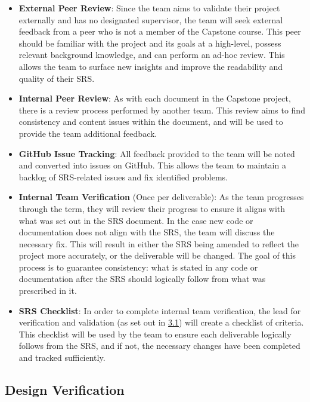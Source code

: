 \documentclass[12pt, titlepage]{article}
\begin{document}
\begin{itemize}
  \item \textbf{External Peer Review}: Since the team aims to validate their project externally and \progname{} has no designated supervisor, the team will seek
  external feedback from a peer who is not a member of the Capstone course. This peer should be familiar with the project and its goals at a high-level, 
  possess relevant background knowledge, and can perform an ad-hoc review. This allows the team to surface new insights and improve the readability and quality of their SRS.
  \item \textbf{Internal Peer Review}: As with each document in the Capstone project, there is a review process performed by another team.
  This review aims to find consistency and content issues within the document, and will be used to provide the team additional feedback.
  \item \textbf{GitHub Issue Tracking}: All feedback provided to the team will be noted and converted into issues on GitHub. This allows the team to maintain a backlog
  of SRS-related issues and fix identified problems.
  \item \textbf{Internal Team Verification} (Once per deliverable): As the team progresses through the term, they will review their
  progress to ensure it aligns with what was set out in the SRS document. In the case new code or documentation does not align
  with the SRS, the team will discuss the necessary fix. This will result in either the SRS being amended to reflect the project more accurately,
  or the deliverable will be changed. The goal of this process is to guarantee consistency: what is stated in any code or documentation after the SRS
  should logically follow from what was prescribed in it.
  \item \textbf{SRS Checklist}: In order to complete internal team verification, the lead for verification and validation (as set out in \hyperref[sec:VnVTeam]{3.1}) will
  create a checklist of criteria. This checklist will be used by the team to ensure each deliverable logically follows from the SRS, and if not, the necessary changes have 
  been completed and tracked sufficiently.

\end{itemize}

\subsection{Design Verification}
\label{sec:DesignVer}
\end{document}
